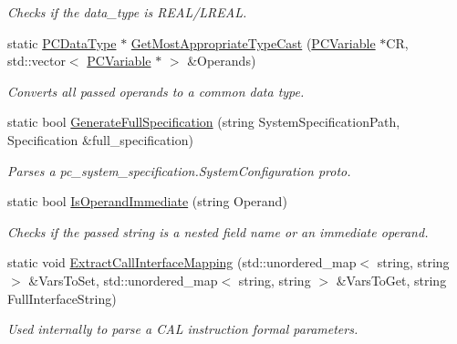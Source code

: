 \begin{DoxyCompactItemize}
\begin{DoxyCompactList}\small\item\em Checks if the data\+\_\+type is R\+E\+A\+L/\+L\+R\+E\+AL. \end{DoxyCompactList}\item 
static \hyperlink{classpc__emulator_1_1PCDataType}{P\+C\+Data\+Type} $\ast$ \hyperlink{classpc__emulator_1_1Utils_afb4ce66f03d351d7fb7bf0632cce5ed7}{Get\+Most\+Appropriate\+Type\+Cast} (\hyperlink{classpc__emulator_1_1PCVariable}{P\+C\+Variable} $\ast$CR, std\+::vector$<$ \hyperlink{classpc__emulator_1_1PCVariable}{P\+C\+Variable} $\ast$ $>$ \&Operands)
\begin{DoxyCompactList}\small\item\em Converts all passed operands to a common data type. \end{DoxyCompactList}\item 
static bool \hyperlink{classpc__emulator_1_1Utils_ad155603916c2f69e6660378990dfed1d}{Generate\+Full\+Specification} (string System\+Specification\+Path, Specification \&full\+\_\+specification)
\begin{DoxyCompactList}\small\item\em Parses a pc\+\_\+system\+\_\+specification.\+System\+Configuration proto. \end{DoxyCompactList}\item 
static bool \hyperlink{classpc__emulator_1_1Utils_af4f9529c4bf826187c06328dfd210c8b}{Is\+Operand\+Immediate} (string Operand)\hypertarget{classpc__emulator_1_1Utils_af4f9529c4bf826187c06328dfd210c8b}{}\label{classpc__emulator_1_1Utils_af4f9529c4bf826187c06328dfd210c8b}

\begin{DoxyCompactList}\small\item\em Checks if the passed string is a nested field name or an immediate operand. \end{DoxyCompactList}\item 
static void \hyperlink{classpc__emulator_1_1Utils_a30fe3b319a10dc00a5805a5eba020998}{Extract\+Call\+Interface\+Mapping} (std\+::unordered\+\_\+map$<$ string, string $>$ \&Vars\+To\+Set, std\+::unordered\+\_\+map$<$ string, string $>$ \&Vars\+To\+Get, string Full\+Interface\+String)\hypertarget{classpc__emulator_1_1Utils_a30fe3b319a10dc00a5805a5eba020998}{}\label{classpc__emulator_1_1Utils_a30fe3b319a10dc00a5805a5eba020998}

\begin{DoxyCompactList}\small\item\em Used internally to parse a C\+AL instruction formal parameters. \end{DoxyCompactList}\end{DoxyCompactItemize}


